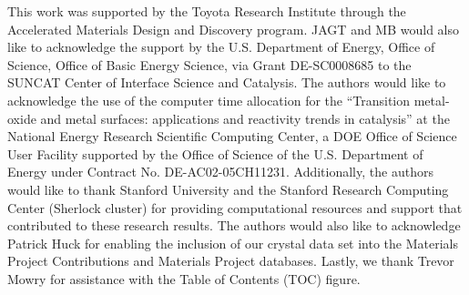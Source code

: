 %

This work was supported by the Toyota Research Institute through the Accelerated Materials Design and Discovery program.
%
JAGT and MB would also like to acknowledge the support by the U.S. Department of Energy, Office of Science, Office of Basic Energy Science, via Grant DE-SC0008685 to the SUNCAT Center of Interface Science and Catalysis.
%
The authors would like to acknowledge the use of the computer time allocation for the
“Transition metal-oxide and metal surfaces: applications and reactivity trends in catalysis”
at the National Energy Research Scientific Computing Center, a DOE Office of Science User Facility supported by the Office of Science of the U.S. Department of Energy under Contract No. DE-AC02-05CH11231.
%
Additionally, the authors would like to thank Stanford University and the Stanford Research Computing Center (Sherlock cluster) for providing computational resources and support that contributed to these research results.
%
%
The authors would also like to acknowledge Patrick Huck for enabling
the inclusion of our \IrOx crystal data set into the Materials Project Contributions and Materials Project databases.
%
Lastly, we thank Trevor Mowry for assistance with the Table of Contents (TOC) figure.
